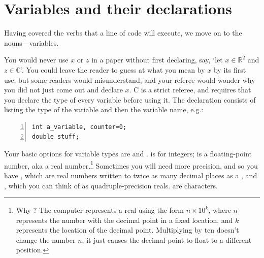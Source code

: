  


\section{Variables and their declarations} \label{declaring}

Having covered the verbs that a line of code will execute, we move on
to the nouns---variables. 

You would never use $x$ or $z$ in a paper without first declaring,
say, `let $x \in {\mathbb R}^2$ and $z \in {\mathbb C}$'. You could
leave the reader to guess at what you mean by $x$ by its first use,
but some readers would misunderstand, and your referee would wonder why
you did not just come out and declare $x$. C is a strict referee, and
requires that you declare the type of every variable before using it.
The declaration consists of listing the type of the variable and then
the variable name, e.g.:

\begin{lstlisting}[numbers=left, numberstyle=\scshape]
int a_variable, counter=0;
double stuff;
\end{lstlisting}


Your basic options for variable types are  
and .  is for integers;
 is a floating-point number, aka a real number.\footnote{Why ? The
computer represents a real using the form $n \times 10^k$, where $n$
represents the number with the decimal point in a fixed location,
and $k$ represents the location of the decimal point.  Multiplying by
ten doesn't change the number $n$, it just causes the decimal point to
float to a different position.} Sometimes you will need more precision,
and so you have , which are real numbers written to twice
as many decimal places as a ,
and , which you can think of as quadruple-precision
reals.  are characters.	

